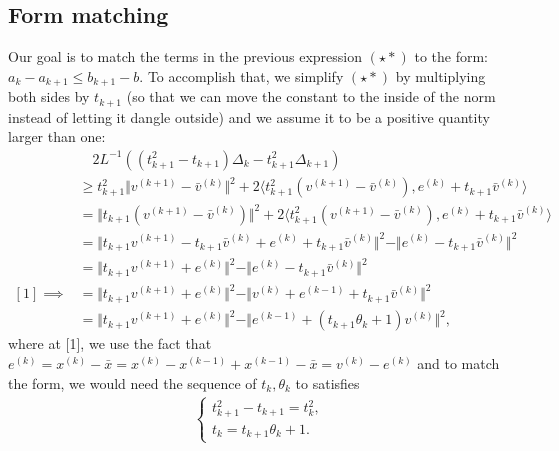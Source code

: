 \documentclass[]{article}
\theoremstyle{definition}
\begin{document}
    \subsection{Form matching}
        Our goal is to match the terms in the previous expression $(\star*)$ to the form: $a_k - a_{k + 1}\le b_{k + 1} - b$. To accomplish that, we simplify $(\star*)$ by multiplying both sides by $t_{k + 1}$ (so that we can move the constant to the inside of the norm instead of letting it dangle outside) and we assume it to be a positive quantity larger than one: 
        \begin{align*}
            & \quad 2L^{-1}((t_{k + 1}^2 - t_{k + 1})\Delta_k - t_{k + 1}^2\Delta_{k + 1})
            \\
            & \ge  
            t_{k + 1}^2\Vert v^{(k + 1)} - \bar v^{(k)}\Vert^2 + 
            2\langle t_{k + 1}^2(v^{(k + 1)} - \bar v^{(k)}), e^{(k)} + t_{k + 1} \bar v^{(k)}\rangle
            \\
            &=
            \Vert t_{k + 1} (v^{(k + 1)} - \bar v^{(k)}) \Vert^2 + 
            2\langle t_{k + 1}^2(v^{(k + 1)} - \bar v^{(k)}), e^{(k)} + t_{k + 1}\bar v^{(k)}\rangle
            \\
            &=
            \Vert t_{k+1} v^{(k + 1)} - t_{k + 1}\bar v^{(k)} + e^{(k)} + t_{k + 1}\bar v^{(k)}\Vert^2
            - 
            \Vert e^{(k)} - t_{k + 1} \bar v^{(k)}\Vert^2
            \\
            &=
            \Vert 
                t_{k+1} v^{(k + 1)} + e^{(k)}
            \Vert^2
            - 
            \Vert e^{(k)} - t_{k + 1} \bar v^{(k)}\Vert^2
            \\
            [1]\implies
            & = 
            \Vert t_{k + 1}v^{(k + 1)} + e^{(k)}\Vert^2
            - 
            \Vert v^{(k)} + e^{(k - 1)} + t_{k + 1}\bar v^{(k)} \Vert^2
            \\
            & = 
            \Vert t_{k + 1}v^{(k + 1)} + e^{(k)}\Vert^2
            - 
            \Vert e^{(k - 1)} + (t_{k + 1}\theta_k + 1) v^{(k)} \Vert^2, 
            \tag{$\star \star$}
        \end{align*}
        where at [1], we use the fact that $e^{(k)}= x^{(k)} - \bar x = x^{(k)} - x^{(k - 1)}+ x^{(k - 1)} - \bar x = v^{(k)} - e^{(k)}$ and to match the form, we would need the sequence of $t_k, \theta_k$ to satisfies
        \begin{align*}
            \begin{cases}
                t^2_{k + 1} - t_{k + 1} = t_k^2,
                \\
                t_k = t_{k + 1}\theta_k + 1. 
            \end{cases}
            \tag{$\star **$}
        \end{align*}
\end{document}
